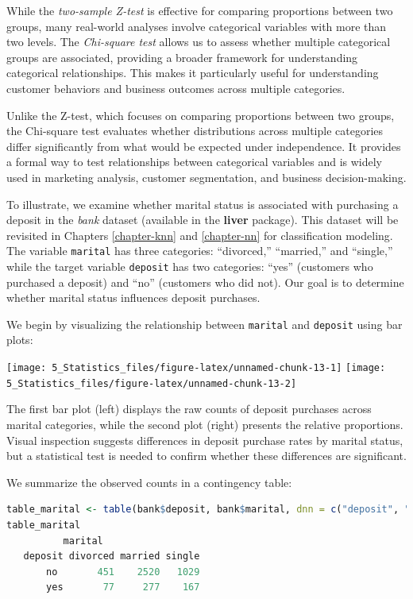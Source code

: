 \documentclass[
  11pt,
]{book}
\newcommand{\passthrough}[1]{#1}
\theoremstyle{definition}
\theoremstyle{definition}
\theoremstyle{definition}
\theoremstyle{definition}
\theoremstyle{remark}
\begin{document}
While the \emph{two-sample Z-test} is effective for comparing proportions between two groups, many real-world analyses involve categorical variables with more than two levels. The \emph{Chi-square test} allows us to assess whether multiple categorical groups are associated, providing a broader framework for understanding categorical relationships. This makes it particularly useful for understanding customer behaviors and business outcomes across multiple categories.

Unlike the Z-test, which focuses on comparing proportions between two groups, the Chi-square test evaluates whether distributions across multiple categories differ significantly from what would be expected under independence. It provides a formal way to test relationships between categorical variables and is widely used in marketing analysis, customer segmentation, and business decision-making.

To illustrate, we examine whether marital status is associated with purchasing a deposit in the \emph{bank} dataset (available in the \textbf{liver} package). This dataset will be revisited in Chapters \ref{chapter-knn} and \ref{chapter-nn} for classification modeling. The variable \passthrough{\lstinline!marital!} has three categories: ``divorced,'' ``married,'' and ``single,'' while the target variable \passthrough{\lstinline!deposit!} has two categories: ``yes'' (customers who purchased a deposit) and ``no'' (customers who did not). Our goal is to determine whether marital status influences deposit purchases.

We begin by visualizing the relationship between \passthrough{\lstinline!marital!} and \passthrough{\lstinline!deposit!} using bar plots:

\texttt{[image: 5\_Statistics\_files/figure-latex/unnamed-chunk-13-1]} \texttt{[image: 5\_Statistics\_files/figure-latex/unnamed-chunk-13-2]}

The first bar plot (left) displays the raw counts of deposit purchases across marital categories, while the second plot (right) presents the relative proportions. Visual inspection suggests differences in deposit purchase rates by marital status, but a statistical test is needed to confirm whether these differences are significant.

We summarize the observed counts in a contingency table:

\begin{lstlisting}[language=R]
table_marital <- table(bank$deposit, bank$marital, dnn = c("deposit", "marital"))
table_marital
          marital
   deposit divorced married single
       no       451    2520   1029
       yes       77     277    167
\end{lstlisting}
\end{document}
